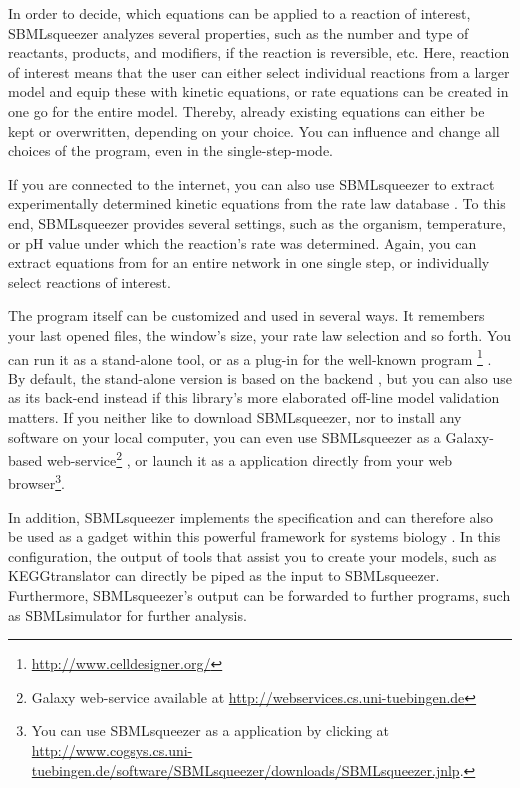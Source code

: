 In order to decide, which equations can be applied to a reaction of interest,
SBMLsqueezer analyzes several properties, such as the number and type of
reactants, products, and modifiers, if the reaction is reversible, etc.
Here, reaction of interest means that the user can either select individual
reactions from a larger model and equip these with kinetic equations, or rate
equations can be created in one go for the entire model.
Thereby, already existing equations can either be kept or overwritten, depending
on your choice.
You can influence and change all choices of the program, even in the single-step-mode.

If you are connected to the internet, you can also use SBMLsqueezer to extract
experimentally determined kinetic equations from the rate law database \SABIO
\citep{Wittig2006, Rojas2007, Krebs2007, Wittig2012}.
To this end, SBMLsqueezer provides several settings, such as the organism,
temperature, or pH value under which the reaction's rate was determined. Again,
you can extract equations from \SABIO for an entire network in one single step, or
individually select reactions of interest.

The program itself can be customized and used in several ways. It remembers your
last opened files, the window's size, your rate law selection and so forth.
You can run it as a stand-alone tool, or as a plug-in for the well-known program
\CellDesigner\footnote{\url{http://www.celldesigner.org/}}
\citep{Funahashi2003, Funahashi2006, Funahashi2007a, Funahashi2008}.
By default, the stand-alone version is based on the \JSBML backend 
\citep{Draeger2011b}, but you can also use \libSBML \citep{Bornstein2008} as its
\SBML back-end instead if this library's more elaborated off-line model validation
matters.
If you neither like to download SBMLsqueezer, nor to install any software on
your local computer, you can even use SBMLsqueezer as a Galaxy-based
web-service\footnote{Galaxy web-service available at \url{http://webservices.cs.uni-tuebingen.de}} \citet{Goecks2010},
or launch it as a \JavaWebStart application directly from your web
browser\footnote{You can use SBMLsqueezer as a \JavaWebStart application by
clicking at \url{http://www.cogsys.cs.uni-tuebingen.de/software/SBMLsqueezer/downloads/SBMLsqueezer.jnlp}.}.

In addition, SBMLsqueezer implements the \Garuda specification and can therefore
also be used as a gadget within this powerful framework for systems biology
\citep{Ghosh2011}. In this configuration, the output of tools that assist you
to create your models, such as KEGGtranslator \citep{Wrzodek2011, Wrzodek2013}
can directly be piped as the input to SBMLsqueezer. Furthermore, SBMLsqueezer's
output can be forwarded to further programs, such as SBMLsimulator
\citep{Keller2013} for further analysis.

